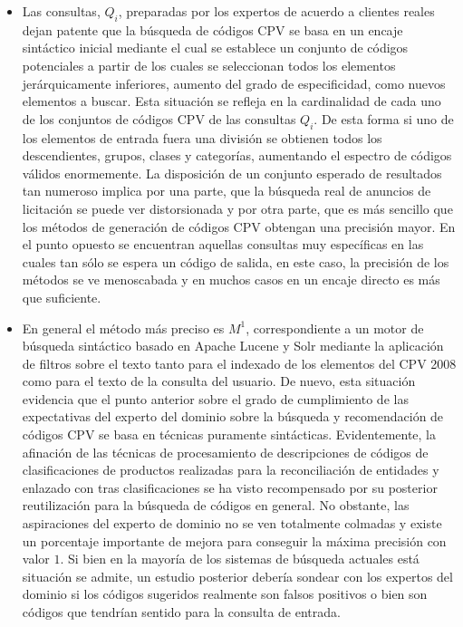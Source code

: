\begin{itemize}
 \item Las consultas, $Q_{i}$, preparadas por los expertos de acuerdo a clientes reales dejan patente 
que la búsqueda de códigos CPV se basa en un encaje sintáctico inicial mediante el cual se 
establece un conjunto de códigos potenciales a partir de los cuales se seleccionan todos los 
elementos jerárquicamente inferiores, aumento del grado de especificidad, como nuevos elementos 
a buscar. Esta situación se refleja en la cardinalidad de cada uno de los conjuntos de códigos 
CPV de las consultas $Q_{i}$. De esta forma si uno de los elementos de entrada fuera una división 
se obtienen todos los descendientes, grupos, clases y categorías, aumentando el espectro de códigos 
válidos enormemente. La disposición de un conjunto esperado de resultados tan numeroso implica por una parte, que 
la búsqueda real de anuncios de licitación se puede ver distorsionada y por otra parte, que es más sencillo 
que los métodos de generación de códigos CPV obtengan una precisión mayor. En el punto opuesto se encuentran 
aquellas consultas muy específicas en las cuales tan sólo se espera un código de salida, en este caso, la precisión 
de los métodos se ve menoscabada y en muchos casos en un encaje directo es más que suficiente.

\item En general el método más preciso es $M^1$, correspondiente a un motor de búsqueda 
sintáctico basado en Apache \gls{Lucene} y \gls{Solr} mediante la aplicación de filtros sobre el texto tanto 
para el indexado de los elementos del CPV 2008 como para el texto de la consulta del usuario. De nuevo, 
esta situación evidencia que el punto anterior sobre el grado de cumplimiento de las expectativas del experto 
del dominio sobre la búsqueda y recomendación de códigos CPV se basa en técnicas puramente sintácticas. Evidentemente, 
la afinación de las técnicas de procesamiento de descripciones de códigos de clasificaciones de productos realizadas 
para la reconciliación de entidades y enlazado con tras clasificaciones se ha visto recompensado por su posterior 
reutilización para la búsqueda de códigos en general. No obstante, las aspiraciones del experto de dominio no se ven 
totalmente colmadas y existe un porcentaje importante de mejora para conseguir la máxima precisión con valor $1$. Si bien 
en la mayoría de los sistemas de búsqueda actuales está situación se admite, un estudio posterior debería sondear con los 
expertos del dominio si los códigos sugeridos realmente son falsos positivos o bien son códigos que tendrían sentido 
para la consulta de entrada.


\end{itemize}
